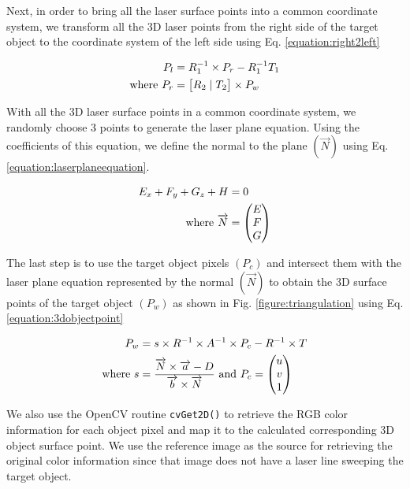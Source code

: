 Next, in order to bring all the laser surface points into a common coordinate
system, we transform all the 3D laser points from the right side of the
target object to the coordinate system of the left side using Eq.
\ref{equation:right2left}

\begin{align}
	\label{equation:right2left}
	P_{l} &= R_1^{-1} \times P_{r} - R_1^{-1}T_1 \\
	\text{where}~
	P_{r} &= \begin{bmatrix}
									R_2 \mid T_2
 				  \end{bmatrix} \times P_w \notag
\end{align}

With all the 3D laser surface points in a common coordinate system, we
randomly choose 3 points to generate the laser plane equation. Using the
coefficients of this equation, we define the normal to the plane
$(\overrightarrow{N})$ using Eq. \ref{equation:laserplaneequation}.

\begin{align}
	\label{equation:laserplaneequation}
	E_x + F_y + G_z + H &= 0 \\
	\text{where}~
	 \overrightarrow{N} &=
	 \begin{pmatrix}
	  E \\
	  F \\
	  G \\
	 \end{pmatrix} \notag
\end{align}

The last step is to use the target object pixels $(P_c)$ and intersect them
with the laser plane equation represented by the normal $(\overrightarrow{N})$
to obtain the 3D surface points of the target object $(P_w)$ as shown in
Fig. \ref{figure:triangulation} using Eq. \ref{equation:3dobjectpoint}

\begin{align}
	\label{equation:3dobjectpoint}
	P_w &= s \times R^{-1}
 					 \times A^{-1}
					 \times P_c
					- R^{-1} \times T \\
	\text{where}~
	s &= \frac{\overrightarrow{N}\times\overrightarrow{a} - D}
						{\overrightarrow{b}\times\overrightarrow{N}}
  ~\text{and}~ P_c = \begin{pmatrix}
												u \\
												v \\
												1 \\
										 \end{pmatrix} \notag
\end{align}

We also use the OpenCV routine \texttt{cvGet2D()} to retrieve the RGB color
information for each object pixel and map it to the calculated corresponding
3D object surface point. We use the reference image as the source for
retrieving the original color information since that image does not have a
laser line sweeping the target object.
